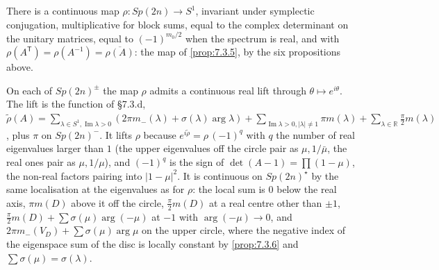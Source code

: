 \begin{theorem}
  \label{thm:7.1.3}
  \leanok
  There is a continuous map $\rho : Sp(2n) \to S^1$, invariant under symplectic
  conjugation, multiplicative for block sums, equal to the complex determinant
  on the unitary matrices, equal to $(-1)^{m_0/2}$ when the spectrum is real,
  and with $\rho(A^{\mathsf T}) = \rho(A^{-1}) = \overline{\rho(A)}$: the map of
  \ref{prop:7.3.5}, by the six propositions above.
\end{theorem}

\begin{lemma}
  \label{lem:7.1.6}
  \leanok
  On each of $Sp(2n)^\pm$ the map $\rho$ admits a continuous real lift through
  $\theta \mapsto e^{i\theta}$.  The lift is the function of \S7.3.d,
  $\tilde\rho(A) = \sum_{\lambda \in S^1, \operatorname{Im}\lambda > 0}
  (2\pi m_-(\lambda) + \sigma(\lambda)\arg\lambda) + \sum_{\operatorname{Im}\lambda > 0,
  \lvert\lambda\rvert \neq 1} \pi m(\lambda) + \sum_{\lambda \in \mathbb{R}}
  \tfrac{\pi}{2} m(\lambda)$, plus $\pi$ on $Sp(2n)^-$.  It lifts $\rho$ because
  $e^{i\tilde\rho} = \rho\,(-1)^q$ with $q$ the number of real eigenvalues larger
  than $1$ (the upper eigenvalues off the circle pair as $\mu, 1/\bar\mu$, the
  real ones pair as $\mu, 1/\mu$), and $(-1)^q$ is the sign of $\det(A - 1)
  = \prod(1 - \mu)$, the non-real factors pairing into $\lvert 1 - \mu\rvert^2$.
  It is continuous on $Sp(2n)^\star$ by the same localisation at the eigenvalues
  as for $\rho$: the local sum is $0$ below the real axis, $\pi m(D)$ above it
  off the circle, $\tfrac{\pi}{2} m(D)$ at a real centre other than $\pm 1$,
  $\tfrac{\pi}{2} m(D) + \sum \sigma(\mu)\arg(-\mu)$ at $-1$ with
  $\arg(-\mu) \to 0$, and $2\pi m_-(V_D) + \sum\sigma(\mu)\arg\mu$ on the upper
  circle, where the negative index of the eigenspace sum of the disc is locally
  constant by \ref{prop:7.3.6} and $\sum\sigma(\mu) = \sigma(\lambda)$.
\end{lemma}

